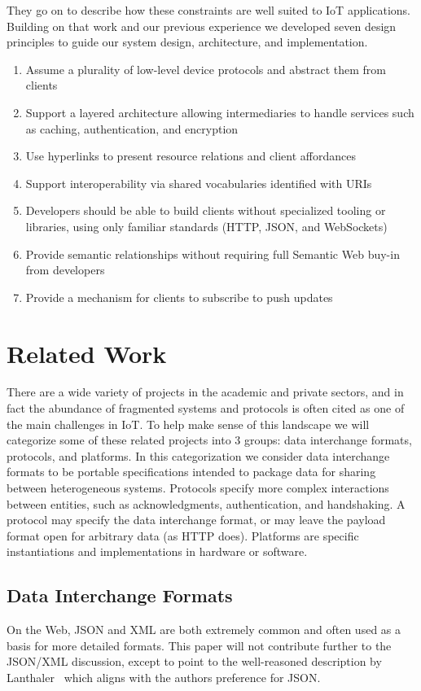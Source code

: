 \documentclass{acm_proc_article-sp}
\newenvironment{tightenumerate}{
    \vspace{-10pt}
    \begin{enumerate}
        \setlength{\parskip}{-1pt}}{
    \end{enumerate}
    \vspace{-10pt}}
\begin{document}
They go on to describe how these constraints are well suited to IoT
applications. Building on that work and our previous experience we developed
seven design principles to guide our system design, architecture, and
implementation.

\begin{tightenumerate}
    \item Assume a plurality of low-level device protocols and abstract them
        from clients
    \item Support a layered architecture allowing intermediaries to handle
        services such as caching, authentication, and encryption
    \item Use hyperlinks to present resource relations and client affordances
    \item Support interoperability via shared vocabularies identified with URIs
    \item Developers should be able to build clients without specialized
        tooling or libraries, using only familiar standards (HTTP, JSON, and
        WebSockets)
    \item Provide semantic relationships without requiring full Semantic Web
        buy-in from developers
    \item Provide a mechanism for clients to subscribe to push updates
\end{tightenumerate}

\section{Related Work}

There are a wide variety of projects in the academic and private sectors, and
in fact the abundance of fragmented systems and protocols is often cited as one
of the main challenges in IoT. To help make sense of this landscape we will
categorize some of these related projects into 3 groups: data interchange
formats, protocols, and platforms. In this categorization we consider data
interchange formats to be portable specifications intended to package data for
sharing between heterogeneous systems. Protocols specify more complex
interactions between entities, such as acknowledgments, authentication, and
handshaking. A protocol may specify the data interchange format, or may leave
the payload format open for arbitrary data (as HTTP does). Platforms are
specific instantiations and implementations in hardware or software.

\subsection{Data Interchange Formats} On the Web, JSON and XML are both
extremely common and often used as a basis for more detailed formats. This
paper will not contribute further to the JSON/XML discussion, except to point
to the well-reasoned description by Lanthaler~\cite{semaphobia} which aligns
with the authors preference for JSON.
\end{document}
